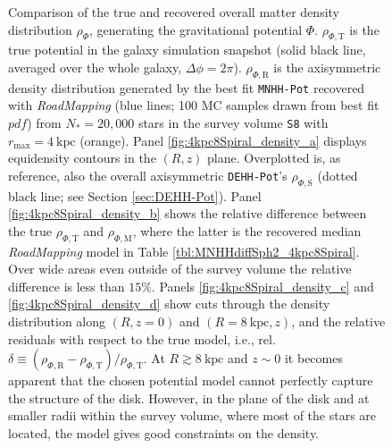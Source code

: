 \documentclass[iop,revtex4,numberedappendix,appendixfloats]{emulateapj}
\newcommand{\RM}{{\sl RoadMapping}}
\begin{document}
\begin{figure}[!htbp]
\caption{Comparison of the true and recovered overall matter density distribution $\rho_{\Phi}$, generating the gravitational potential $\Phi$. $\rho_{\Phi,\text{T}}$ is the true potential in the galaxy simulation snapshot (solid black line, averaged over the whole galaxy, $\Delta\phi=2\pi$). $\rho_{\Phi,\text{R}}$ is the axisymmetric density distribution generated by the best fit \texttt{MNHH-Pot} recovered with \RM{} (blue lines; 100 MC samples drawn from best fit $pdf$) from $N_*=20,000$ stars in the survey volume \texttt{S8} with $r_\text{max}=4~\text{kpc}$ (orange). Panel \ref{fig:4kpc8Spiral_density_a} displays equidensity contours in the $(R,z)$ plane. Overplotted is, as reference, also the overall axisymmetric \texttt{DEHH-Pot}'s $\rho_{\Phi,\text{S}}$ (dotted black line; see Section \ref{sec:DEHH-Pot}). Panel \ref{fig:4kpc8Spiral_density_b} shows the relative difference between the true $\rho_{\Phi,\text{T}}$ and $\rho_{\Phi,\text{M}}$, where the latter is the recovered median \RM{} model in Table \ref{tbl:MNHHdiffSph2_4kpc8Spiral}. Over wide areas even outside of the survey volume the relative difference is less than $15\%$. Panels \ref{fig:4kpc8Spiral_density_c} and \ref{fig:4kpc8Spiral_density_d} show cuts through the density distribution along $(R,z=0)$ and $(R=8~\text{kpc},z)$, and the relative residuals with respect to the true model, i.e., rel. $\delta \equiv (\rho_{\Phi,\text{R}}-\rho_{\Phi,\text{T}})/\rho_{\Phi,\text{T}}$. At $R\gtrsim8~\text{kpc}$ and $z\sim0$ it becomes apparent that the chosen potential model cannot perfectly capture the structure of the disk. However, in the plane of the disk and at smaller radii within the survey volume, where most of the stars are located, the model gives good constraints on the density.}
\label{fig:4kpc8Spiral_density}
\end{figure}
\end{document}
